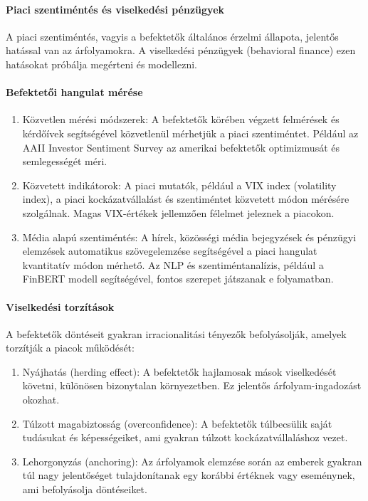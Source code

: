 \documentclass[11pt]{article}
\begin{document}
\paragraph{Piaci szentiméntés és viselkedési
pénzügyek}\label{piaci-szentimuxe9ntuxe9s-uxe9s-viselkeduxe9si-puxe9nzuxfcgyek}

A piaci szentiméntés, vagyis a befektetők általános érzelmi állapota,
jelentős hatással van az árfolyamokra. A viselkedési pénzügyek
(behavioral finance) ezen hatásokat próbálja megérteni és modellezni.

\paragraph{Befektetői hangulat
mérése}\label{befektetux151i-hangulat-muxe9ruxe9se}

\begin{enumerate}
\def\labelenumi{\arabic{enumi}.}
\item
  Közvetlen mérési módszerek: A befektetők körében végzett felmérések és
  kérdőívek segítségével közvetlenül mérhetjük a piaci szentiméntet.
  Például az AAII Investor Sentiment Survey az amerikai befektetők
  optimizmusát és semlegességét méri.
\item
  Közvetett indikátorok: A piaci mutatók, például a VIX index
  (volatility index), a piaci kockázatvállalást és szentiméntet
  közvetett módon mérésére szolgálnak. Magas VIX-értékek jellemzően
  félelmet jeleznek a piacokon.
\item
  Média alapú szentiméntés: A hírek, közösségi média bejegyzések és
  pénzügyi elemzések automatikus szövegelemzése segítségével a piaci
  hangulat kvantitatív módon mérhető. Az NLP és szentiméntanalízis,
  például a FinBERT modell segítségével, fontos szerepet játszanak e
  folyamatban.
\end{enumerate}

\paragraph{Viselkedési
torzítások}\label{viselkeduxe9si-torzuxedtuxe1sok}

A befektetők döntéseit gyakran irracionalitási tényezők befolyásolják,
amelyek torzítják a piacok működését:

\begin{enumerate}
\def\labelenumi{\arabic{enumi}.}
\item
  Nyájhatás (herding effect): A befektetők hajlamosak mások viselkedését
  követni, különösen bizonytalan környezetben. Ez jelentős
  árfolyam-ingadozást okozhat.
\item
  Túlzott magabiztosság (overconfidence): A befektetők túlbecsülik saját
  tudásukat és képességeiket, ami gyakran túlzott kockázatvállaláshoz
  vezet.
\item
  Lehorgonyzás (anchoring): Az árfolyamok elemzése során az emberek
  gyakran túl nagy jelentőséget tulajdonítanak egy korábbi értéknek vagy
  eseménynek, ami befolyásolja döntéseiket.
\end{enumerate}
\end{document}
